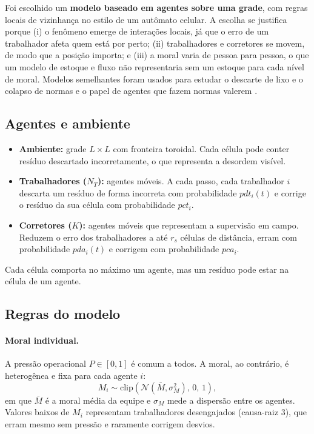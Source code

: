 \documentclass[11pt, a4paper]{article}
\begin{document}
Foi escolhido um \textbf{modelo baseado em agentes sobre uma grade}, com regras locais de vizinhança no estilo de um autômato celular. A escolha se justifica porque (i) o fenômeno emerge de interações locais, já que o erro de um trabalhador afeta quem está por perto; (ii) trabalhadores e corretores se movem, de modo que a posição importa; e (iii) a moral varia de pessoa para pessoa, o que um modelo de estoque e fluxo não representaria sem um estoque para cada nível de moral. Modelos semelhantes foram usados para estudar o descarte de lixo e o colapso de normas \citep{rangoni2017} e o papel de agentes que fazem normas valerem \citep{savarimuthu2008}.

\subsection{Agentes e ambiente}
\begin{itemize}
  \item \textbf{Ambiente:} grade $L\times L$ com fronteira toroidal. Cada célula pode conter resíduo descartado incorretamente, o que representa a desordem visível.
  \item \textbf{Trabalhadores ($N_T$):} agentes móveis. A cada passo, cada trabalhador $i$ descarta um resíduo de forma incorreta com probabilidade $pdt_i(t)$ e corrige o resíduo da sua célula com probabilidade $pct_i$.
  \item \textbf{Corretores ($K$):} agentes móveis que representam a supervisão em campo. Reduzem o erro dos trabalhadores a até $r_s$ células de distância, erram com probabilidade $pda_i(t)$ e corrigem com probabilidade $pca_i$.
\end{itemize}
Cada célula comporta no máximo um agente, mas um resíduo pode estar na célula de um agente.

\subsection{Regras do modelo}
\paragraph{Moral individual.}
A pressão operacional $P\in[0,1]$ é comum a todos. A moral, ao contrário, é heterogênea e fixa para cada agente $i$:
\[
M_i \sim \mathrm{clip}\!\left(\mathcal{N}(\bar{M},\sigma_M^2),\,0,\,1\right),
\]
em que $\bar{M}$ é a moral média da equipe e $\sigma_M$ mede a dispersão entre os agentes. Valores baixos de $M_i$ representam trabalhadores desengajados (causa-raiz 3), que erram mesmo sem pressão e raramente corrigem desvios.
\end{document}
